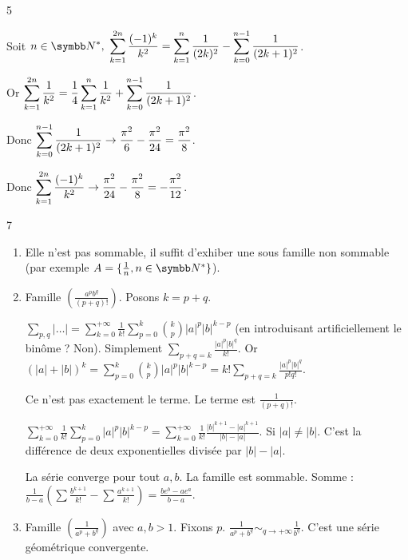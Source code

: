 \begin{correction}{5}

Soit $\ds n \in \N^*,~ \sum_{k=1}^{2n} \frac {(-1)^k} {k^2} = \sum_{k=1}^n \frac 1 {(2k)^2} - \sum_{k=0}^{n-1} \frac 1 {(2k+1)^2}$.    

Or $\displaystyle \sum_{k=1}^{2n} \frac 1 {k^2} = \frac 1 4 \sum_{k=1}^n \frac 1 {k^2} + \sum_{k=0}^{n-1} \frac 1 {(2k+1)^2}$.

Donc $\displaystyle \sum_{k=0}^{n-1} \frac 1 {(2k+1)^2} \to \frac {\pi^2} 6 - \frac {\pi^2} {24} = \frac {\pi^2} 8$.

Donc $\displaystyle \sum_{k=1}^{2n} \frac {(-1)^k} {k^2} \to \frac {\pi^2} {24} - \frac {\pi^2} 8 = - \frac {\pi^2} {12}$.
\end{correction}

\begin{correction}{7}
\begin{enumerate}
    \item Elle n'est pas sommable, il suffit d'exhiber une sous famille non sommable (par exemple $A = \{\frac 1 n, n \in \N^*\}$).
    
    \item 
        Famille $\left(\frac{a^p b^q}{(p+q)!}\right)$.
        Posons $k=p+q$.
        
        $\sum_{p,q} | \dots | = \sum_{k=0}^{+ \infty} \frac{1}{k!} \sum_{p=0}^k \binom{k}{p} |a|^p |b|^{k-p}$ 
        (en introduisant artificiellement le binôme ? Non).
        Simplement $\sum_{p+q=k} \frac{|a|^p |b|^q}{k!}$.
        Or $(|a|+|b|)^k = \sum_{p=0}^k \binom{k}{p} |a|^p |b|^{k-p} = k! \sum_{p+q=k} \frac{|a|^p |b|^q}{p! q!}$.

        Ce n'est pas exactement le terme.
        Le terme est $\frac{1}{(p+q)!}$.

        $\sum_{k=0}^{+ \infty} \frac{1}{k!} \sum_{p=0}^k |a|^p |b|^{k-p} = \sum_{k=0}^{+ \infty} \frac{1}{k!} \frac{|b|^{k+1}-|a|^{k+1}}{|b|-|a|}$.
        Si $|a| \neq |b|$. C'est la différence de deux exponentielles divisée par $|b|-|a|$.

        La série converge pour tout $a,b$. La famille est sommable.
        Somme : $\frac{1}{b-a} \left(\sum \frac{b^{k+1}}{k!} - \sum \frac{a^{k+1}}{k!}\right) = \frac{b e^b - a e^a}{b-a}$.

    \item 
        Famille $\left(\frac{1}{a^p+b^q}\right)$ avec $a,b > 1$.
        Fixons $p$. $\frac{1}{a^p+b^q} \sim_{q \to + \infty} \frac{1}{b^q}$. C'est une série géométrique convergente.


\end{enumerate}
\end{correction}
